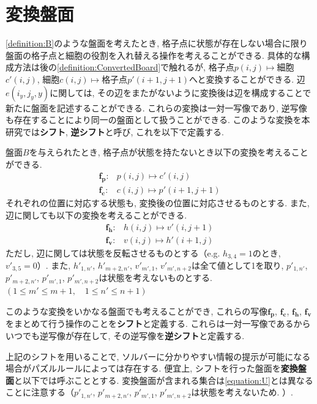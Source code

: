 \section{変換盤面}\label{section:ConvertedBoard}
\cref{definition:B}のような盤面を考えたとき, 格子点に状態が存在しない場合に限り盤面の格子点と細胞の役割を入れ替える操作を考えることができる. 具体的な構成方法は後の\cref{definition:ConvertedBoard}で触れるが, 格子点$p(i,j)\mapsto$細胞$c'(i,j)$, 細胞$c(i,j)\mapsto$格子点$p'(i+1,j+1)$へと変換することができる. 辺$e(i_y,j_y,y)$に関しては, その辺をまたがないように変換後は辺を構成することで新たに盤面を記述することができる. これらの変換は一対一写像であり, 逆写像も存在することにより同一の盤面として扱うことができる. このような変換を本研究では\textbf{シフト}, \textbf{逆シフト}と呼び, これを以下で定義する.
\begin{definition}\label{definition:ConvertedBoard}
  盤面$B$を与えられたとき, 格子点が状態を持たないとき以下の変換を考えることができる.
  \begin{align}
    \bm{f_p}\colon & p(i,j)  \longmapsto c'(i,j)     \\
    \bm{f_c}\colon & c(i,j)  \longmapsto p'(i+1,j+1)
  \end{align}
  それぞれの位置に対応する状態も, 変換後の位置に対応させるものとする. また, 辺に関しても以下の変換を考えることができる.
  \begin{align}
    \bm{f_h}\colon & h(i,j)  \longmapsto v'(i,j+1) \\
    \bm{f_v}\colon & v(i,j)  \longmapsto h'(i+1,j)
  \end{align}
  ただし, 辺に関しては状態を反転させるものとする（e.g. $h_{3,4}=1$のとき, $v'_{3,5}=0$）. また, $h'_{1,n'}$, $h'_{m+2,n'}$, $v'_{m',1}$, $v'_{m',n+2}$は全て値として1を取り, $p'_{1,n'}$, $p'_{m+2,n'}$, $p'_{m',1}$, $p'_{m',n+2}$は状態を考えないものとする. $(1\leq m' \leq m+1, \quad 1\leq n'\leq n+1)$

  このような変換をいかなる盤面でも考えることができ, これらの写像$\bm{f_p}$, $\bm{f_c}$, $\bm{f_h}$, $\bm{f_v}$をまとめて行う操作のことを\textbf{シフト}と定義する. これらは一対一写像であるからいつでも逆写像が存在して, その逆写像を\textbf{逆シフト}と定義する.
\end{definition}
上記のシフトを用いることで, ソルバーに分かりやすい情報の提示が可能になる場合がパズルルールによっては存在する. 便宜上, シフトを行った盤面を\textbf{変換盤面}と以下では呼ぶこととする. 変換盤面が含まれる集合は\cref{equation:U}とは異なることに注意する（$p'_{1,n'}$, $p'_{m+2,n'}$, $p'_{m',1}$, $p'_{m',n+2}$は状態を考えないため. ）.

